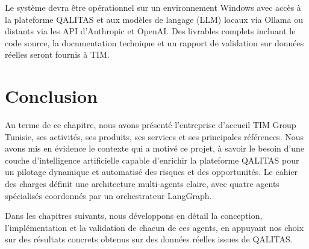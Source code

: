 Le système devra être opérationnel sur un environnement Windows avec accès à la plateforme QALITAS et aux modèles de langage (LLM) locaux via Ollama ou distants via les API d'Anthropic et OpenAI. Des livrables complets incluant le code source, la documentation technique et un rapport de validation sur données réelles seront fournis à TIM.

\section*{Conclusion}

Au terme de ce chapitre, nous avons présenté l'entreprise d'accueil TIM Group Tunisie, ses activités, ses produits, ses services et ses principales références. Nous avons mis en évidence le contexte qui a motivé ce projet, à savoir le besoin d'une couche d'intelligence artificielle capable d'enrichir la plateforme QALITAS pour un pilotage dynamique et automatisé des risques et des opportunités. Le cahier des charges définit une architecture multi-agents claire, avec quatre agents spécialisés coordonnés par un orchestrateur LangGraph.

Dans les chapitres suivants, nous développons en détail la conception, l'implémentation et la validation de chacun de ces agents, en appuyant nos choix sur des résultats concrets obtenus sur des données réelles issues de QALITAS.
